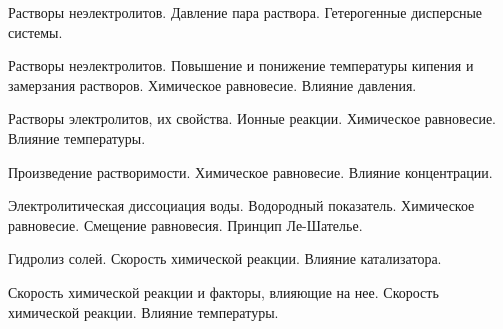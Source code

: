 \documentclass[
	14pt,
	a4paper,
	]
	{scrartcl}
\begin{document}
\vfill
\z Растворы неэлектролитов. Давление пара раствора.
 \vfill
\z Гетерогенные дисперсные системы.
 \vfill

\vfill

\newpage


\shapk
{}
\setcounter{zad}{0}

\vfill
\z Растворы неэлектролитов. Повышение и понижение температуры кипения и замерзания растворов.
 \vfill
\z Химическое равновесие. Влияние давления.
 \vfill

\vfill

\newpage


\shapk
{}
\setcounter{zad}{0}

\vfill
\z Растворы электролитов, их свойства. Ионные реакции.
 \vfill
\z Химическое равновесие. Влияние температуры.
 \vfill

\vfill

\newpage


\shapk
{}
\setcounter{zad}{0}

\vfill
\z Произведение растворимости.
 \vfill
\z Химическое равновесие. Влияние концентрации.
 \vfill

\vfill

\newpage


\shapk
{}
\setcounter{zad}{0}

\vfill
\z Электролитическая диссоциация воды. Водородный показатель.
 \vfill
\z Химическое равновесие. Смещение равновесия. Принцип Ле-Шателье.
 \vfill

\vfill

\newpage


\shapk
{}
\setcounter{zad}{0}

\vfill
\z Гидролиз солей.
 \vfill
\z Скорость химической реакции. Влияние катализатора.
 \vfill

\vfill

\newpage


\shapk
{}
\setcounter{zad}{0}

\vfill
\z Скорость химической реакции и факторы, влияющие на нее.
 \vfill
\z Скорость химической реакции. Влияние температуры.
 \vfill

\vfill

\newpage
\end{document}
